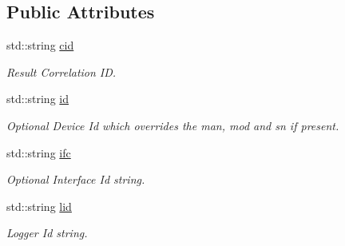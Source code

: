 \subsection*{Public Attributes}
\begin{DoxyCompactItemize}
\item 
\mbox{\label{structsunspec_1_1data_1_1_device_data_a1056f73011728513747a96e31fa9ddc0}} 
std\+::string \hyperlink{structsunspec_1_1data_1_1_device_data_a1056f73011728513747a96e31fa9ddc0}{cid}
\begin{DoxyCompactList}\small\item\em Result Correlation ID. \end{DoxyCompactList}\item 
\mbox{\label{structsunspec_1_1data_1_1_device_data_a40bd089f25f4f67b41650ed5cf5704f3}} 
std\+::string \hyperlink{structsunspec_1_1data_1_1_device_data_a40bd089f25f4f67b41650ed5cf5704f3}{id}
\begin{DoxyCompactList}\small\item\em Optional Device Id which overrides the {\ttfamily man}, {\ttfamily mod} and {\ttfamily sn} if present. \end{DoxyCompactList}\item 
\mbox{\label{structsunspec_1_1data_1_1_device_data_a40ba7b9f2a8348ed9cd4243fed963b6f}} 
std\+::string \hyperlink{structsunspec_1_1data_1_1_device_data_a40ba7b9f2a8348ed9cd4243fed963b6f}{ifc}
\begin{DoxyCompactList}\small\item\em Optional Interface Id string. \end{DoxyCompactList}\item 
\mbox{\label{structsunspec_1_1data_1_1_device_data_abd4b73d94180a81a250c7e7bbf0f45c7}} 
std\+::string \hyperlink{structsunspec_1_1data_1_1_device_data_abd4b73d94180a81a250c7e7bbf0f45c7}{lid}
\begin{DoxyCompactList}\small\item\em Logger Id string. \end{DoxyCompactList}\item 
\mbox{\label{structsunspec_1_1data_1_1_device_data_ac9c16d6cbd4190cb0f55f2ba8327f583}} 

\end{DoxyCompactItemize}
